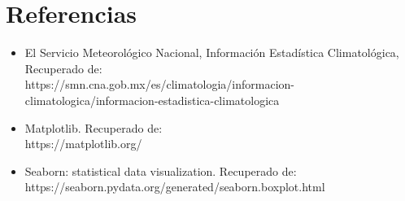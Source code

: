 \documentclass[12pt]{article}
\begin{document}
\section{Referencias}
\begin{itemize}
\item El Servicio Meteorológico Nacional, Información Estadística Climatológica,\\ Recuperado de:\\ https://smn.cna.gob.mx/es/climatologia/informacion-climatologica/informacion-estadistica-climatologica
\item Matplotlib. Recuperado de:\\ https://matplotlib.org/
\item Seaborn: statistical data visualization. Recuperado de:\\ https://seaborn.pydata.org/generated/seaborn.boxplot.html
\end{itemize}
\end{document}
